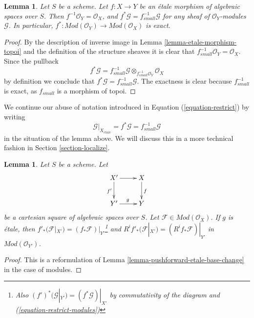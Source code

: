 \documentclass{stacks-project}
\theoremstyle{plain}
\newtheorem{lemma}[subsection]{Lemma}
\theoremstyle{definition}
\theoremstyle{remark}
\numberwithin{equation}{subsection}
\def\etale{{\acute{e}tale}}
\begin{document}
\begin{lemma}
\label{lemma-etale-exact-pullback}
Let $S$ be a scheme.
Let $f : X \to Y$ be an \'etale morphism of algebraic spaces over $S$.
Then $f^{-1}\mathcal{O}_Y = \mathcal{O}_X$, and
$f^*\mathcal{G} = f_{small}^{-1}\mathcal{G}$ for any sheaf of
$\mathcal{O}_Y$-modules $\mathcal{G}$. In particular,
$f^* : \textit{Mod}(\mathcal{O}_Y) \to \textit{Mod}(\mathcal{O}_X)$
is exact.
\end{lemma}

\begin{proof}
By the description of inverse image in Lemma \ref{lemma-etale-morphism-topoi}
and the definition of the structure sheaves it is clear that
$f_{small}^{-1}\mathcal{O}_Y = \mathcal{O}_X$. Since the pullback
$$
f^*\mathcal{G} =
f_{small}^{-1}\mathcal{G} \otimes_{f_{small}^{-1}\mathcal{O}_Y}
\mathcal{O}_X
$$
by definition we conclude that $f^*\mathcal{G} = f_{small}^{-1}\mathcal{G}$.
The exactness is clear because $f_{small}^{-1}$ is exact, as $f_{small}$
is a morphism of topoi.
\end{proof}

\noindent
We continue our abuse of notation introduced in
Equation (\ref{equation-restrict})
by writing
\begin{equation}
\label{equation-restrict-modules}
\mathcal{G}|_{X_\etale}
= f^*\mathcal{G}
= f_{small}^{-1}\mathcal{G}
\end{equation}
in the situation of the lemma above. We will discuss this in a more
technical fashion in
Section \ref{section-localize}.

\begin{lemma}
\label{lemma-pushforward-etale-base-change-modules}
Let $S$ be a scheme. Let
$$
\xymatrix{
X' \ar[r] \ar[d]_{f'} & X \ar[d]^f \\
Y' \ar[r]^g & Y
}
$$
be a cartesian square of algebraic spaces over $S$. Let
$\mathcal{F} \in \textit{Mod}(\mathcal{O}_X)$. If $g$ is \'etale, then
$f'_*(\mathcal{F}|_{X'}) = (f_*\mathcal{F})|_{Y'}$\footnote{Also
$(f')^*(\mathcal{G}|_{Y'}) = (f^*\mathcal{G})|_{X'}$
by commutativity of the diagram and (\ref{equation-restrict-modules})} and
$R^if'_*(\mathcal{F}|_{X'}) = (R^if_*\mathcal{F})|_{Y'}$ in
$\textit{Mod}(\mathcal{O}_{Y'})$.
\end{lemma}

\begin{proof}
This is a reformulation of
Lemma \ref{lemma-pushforward-etale-base-change}
in the case of modules.
\end{proof}
\end{document}

